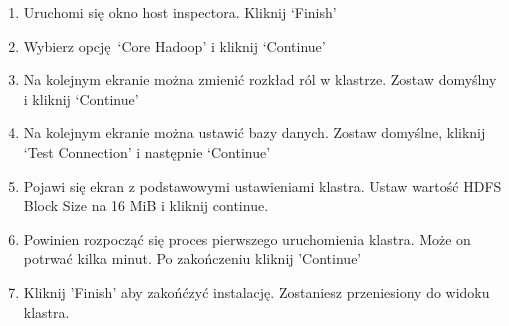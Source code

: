 \documentclass[11pt]{article}
\begin{document}
\begin{enumerate}
\item Uruchomi się okno host inspectora. Kliknij ‘Finish’
\item Wybierz opcję ‘Core Hadoop’ i kliknij ‘Continue’
\item Na kolejnym ekranie można zmienić rozkład ról w klastrze. Zostaw domyślny i kliknij ‘Continue’
\item Na kolejnym ekranie można ustawić bazy danych. Zostaw domyślne, kliknij ‘Test Connection’ i następnie ‘Continue’
\item Pojawi się ekran z podstawowymi ustawieniami klastra. Ustaw wartość HDFS Block Size  na 16 MiB i kliknij continue.
\item Powinien rozpocząć się proces pierwszego uruchomienia klastra. Może on potrwać kilka minut. Po zakończeniu kliknij 'Continue'
\item Kliknij 'Finish' aby zakońćzyć instalację. Zostaniesz przeniesiony do widoku klastra.
\end{enumerate}
\end{document}
